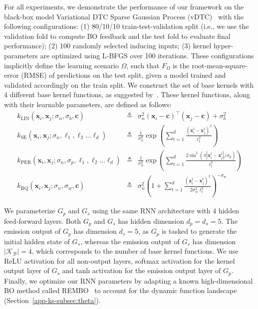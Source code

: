 For all experiments, we demonstrate the performance of our framework on the black-box model Variational DTC Sparse Gaussian Process (vDTC)~\cite{Hensman13} with the following configurations: (1) 80/10/10 train-test-validation split (i.e., we use the validation fold to compute BO feedback and the test fold to evaluate final performance); (2) 100 randomly selected inducing inputs; (3) kernel hyper-parameters are optimized using L-BFGS over 100 iterations. These configurations implicitly define the learning scenario $\Omega$, such that $F_{\Omega}$ is the root-mean-square-error (RMSE) of predictions on the test split, given a model trained and validated accordingly on the train split. We construct the set of base kernels with $4$ different base kernel functions, as suggested by~\citet{Duvenaud13}. These kernel functions, along with their learnable parameters, are defined as follows:
\begin{eqnarray}
k_{\mathrm{LIN}}(\mathbf{x}_i, \mathbf{x}_j; \sigma_n, \sigma_b, \mathbf{c}) &\triangleq& \sigma_n^2 \left(\mathbf{x}_i - \mathbf{c}\right)^\top\left(\mathbf{x}_j - \mathbf{c}\right) + \sigma_b^2 \\
k_{\mathrm{SE}}(\mathbf{x}_i, \mathbf{x}_j; \sigma_n, \ell_1, \ell_2 \dots \ell_d) &\triangleq& \frac{1}{\sigma^2_n} \exp \left(\sum_{t=1}^d \frac{(\mathbf{x}^t_i - \mathbf{x}^t_j)^2}{\ell_t^2}\right) \\
k_{\mathrm{PER}}(\mathbf{x}_i, \mathbf{x}_j; \sigma_n, \sigma_p, \ell_1, \ell_2 \dots \ell_d) &\triangleq& \frac{1}{\sigma^2_n} \exp \left(\sum_{t=1}^d \frac{2\sin^2\left(\pi|\mathbf{x}^t_i - \mathbf{x}^t_j|/\sigma_p\right)}{\ell_t^2}\right) \\
k_{\mathrm{RQ}}(\mathbf{x}_i, \mathbf{x}_j; \sigma_n, \sigma_w, \mathbf{c}) &\triangleq& \sigma_n^2 \left(1 + \sum_{t=1}^d \frac{(\mathbf{x}^t_i - \mathbf{x}^t_j)^2}{2\sigma_w^2\ell^2_t}\right)^{-\sigma_w}
\end{eqnarray}

\noindent We parameterize $G_p$ and $G_s$ using the same RNN architecture with 4 hidden feed-forward layers. Both $G_p$ and $G_s$ has hidden dimension $d_p = d_s = 5$. The emission output of $G_p$ has dimension $d_s=5$, as $G_p$ is tasked to generate the initial hidden state of $G_s$, whereas the emission output of $G_s$ has dimension $|\mathcal{K_B}|=4$, which corresponds to the number of base kernel functions. We use ReLU activation for all non-output layers, softmax activation for the kernel output layer of $G_s$ and tanh activation for the emission output layer of $G_p$. Finally, we optimize our RNN parameters by adapting a known high-dimensional BO method called REMBO~\cite{Wang16} to account for the dynamic function landscape (Section~\ref{app-ks-subsec:theta}). 
